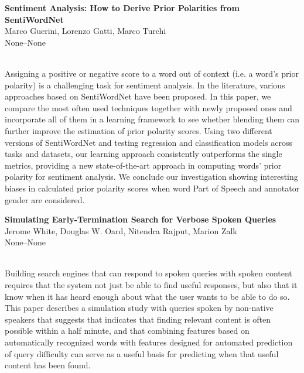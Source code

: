 \documentclass[twoside,makeidx]{book}
\begin{document}
\begin{minipage}{\linewidth}%
\begin{center}
\textbf{\normalsize Sentiment Analysis: How to Derive Prior Polarities from SentiWordNet}\\
\normalsize  Marco Guerini,  Lorenzo Gatti,  Marco Turchi\\
{\small None--None}\\
\end{center}
\end{minipage}\\[0.5em]
\nopagebreak%
\noindent%
{\small Assigning a positive or negative score to a word out of context (i.e. a word's prior polarity) is a challenging task for sentiment analysis. In the literature, various approaches based on SentiWordNet have been proposed.  In this paper, we compare the most often used techniques together with newly proposed ones and incorporate all of them in a learning framework to see whether blending them can further improve the estimation of prior polarity scores.  Using two different versions of SentiWordNet and testing regression and classification models across tasks and datasets, our learning approach consistently outperforms the single metrics, providing a new state-of-the-art approach in computing words' prior polarity for sentiment analysis. We conclude our investigation showing interesting biases in calculated prior polarity scores when word Part of Speech and annotator gender are considered.}
\par\vspace{2em}\noindent%
\begin{minipage}{\linewidth}%
\begin{center}
\textbf{\normalsize Simulating Early-Termination Search for Verbose Spoken Queries}\\
\normalsize  Jerome White,  Douglas W. Oard,  Nitendra Rajput,  Marion Zalk\\
{\small None--None}\\
\end{center}
\end{minipage}\\[0.5em]
\nopagebreak%
\noindent%
{\small Building search engines that can respond to spoken queries with spoken content requires that the system not just be able to find useful responses, but also that it know when it has heard enough about what the user wants to be able to do so. This paper describes a simulation study with queries spoken by non-native speakers that suggests that indicates that finding relevant content is often possible within a half minute, and that combining features based on automatically recognized words with features designed for automated prediction of query difficulty can serve as a useful basis for predicting when that useful content has been found.}
\end{document}
